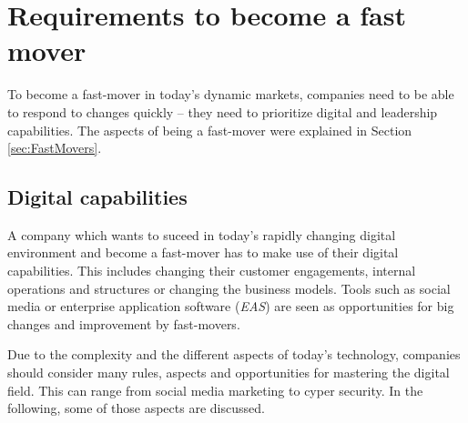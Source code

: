\documentclass[a4]{scrartcl}
\newenvironment{CountingDefinition}[2][]{%
	\ifstrempty{#1}%
	{\mdfsetup{%
			frametitle={{\strut ~}}}
	}%
	{\mdfsetup{%
			frametitle={{\strut ~#1}}}%
	}%
	\mdfsetup{
		nobreak                   = true,
		linecolor                 = gray,
		frametitlebackgroundcolor = gray!50,
		style                     = enviStyle
	}
	\begin{mdframed}[]\relax%
		\label{#2}}{\end{mdframed}}
\begin{document}
	
	
	
	
	
	
	
	\newpage
	\section{Requirements to become a fast mover} \label{sec:ReqFastMovers}
	
	
	To become a fast-mover in today's dynamic markets, companies need to be able to respond to changes quickly -- they need to prioritize digital and leadership capabilities. The aspects of being a fast-mover were explained in Section \ref{sec:FastMovers}.
	
	
	

	
	
	
	
	
	
	\subsection{Digital capabilities} \label{subsec:digitalcapabilities}
	
	A company which wants to suceed in today's rapidly changing digital environment and become a fast-mover %
	has to make use of their digital capabilities. This includes changing their customer engagements, internal operations and structures or changing the business models. Tools such as social media or enterprise application software (\textit{EAS}) are seen as opportunities for big changes and improvement by fast-movers.~\cite{leadingdigital}
	
	Due to the complexity and the different aspects of today's technology, companies should consider many rules, aspects and opportunities for mastering the digital field. This can range from social media marketing to cyper security. In the following, some of those aspects are discussed.
	
\end{document}
